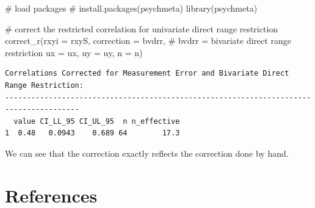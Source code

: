\documentclass[
  letterpaper,
  DIV=11,
  numbers=noendperiod]{scrreprt}
\newenvironment{Shaded}{\begin{snugshade}}{\end{snugshade}}
\newcommand{\AttributeTok}[1]{\textcolor[rgb]{0.40,0.45,0.13}{#1}}
\newcommand{\CommentTok}[1]{\textcolor[rgb]{0.37,0.37,0.37}{#1}}
\newcommand{\FunctionTok}[1]{\textcolor[rgb]{0.28,0.35,0.67}{#1}}
\newcommand{\NormalTok}[1]{\textcolor[rgb]{0.00,0.23,0.31}{#1}}
\newcommand{\StringTok}[1]{\textcolor[rgb]{0.13,0.47,0.30}{#1}}
\begin{document}
\begin{Shaded}
\begin{Highlighting}[]
\CommentTok{\# load packages}
\CommentTok{\# install.packages(\textquotesingle{}psychmeta\textquotesingle{})}
\FunctionTok{library}\NormalTok{(psychmeta)}

\CommentTok{\# correct the restricted correlation for univariate direct range restriction}
\FunctionTok{correct\_r}\NormalTok{(}\AttributeTok{rxyi =}\NormalTok{ rxyS,}
          \AttributeTok{correction =} \StringTok{\textquotesingle{}bvdrr\textquotesingle{}}\NormalTok{,  }\CommentTok{\# bvdrr = bivariate direct range restriction}
          \AttributeTok{ux =}\NormalTok{ ux,}
          \AttributeTok{uy =}\NormalTok{ uy,}
          \AttributeTok{n =}\NormalTok{ n)}
\end{Highlighting}
\end{Shaded}

\begin{verbatim}
Correlations Corrected for Measurement Error and Bivariate Direct Range Restriction:
---------------------------------------------------------------------------------------
  value CI_LL_95 CI_UL_95  n n_effective
1  0.48   0.0943    0.689 64        17.3
\end{verbatim}

We can see that the correction exactly reflects the correction done by
hand.

\hypertarget{references}{%
\section{References}\label{references}}
\end{document}
